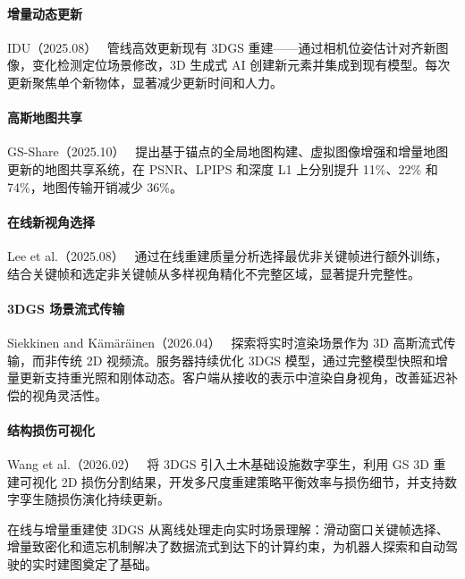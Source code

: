 \paragraph{增量动态更新}

IDU（2025.08）~\cite{2508_17579} 管线高效更新现有 3DGS 重建——通过相机位姿估计对齐新图像，变化检测定位场景修改，3D 生成式 AI 创建新元素并集成到现有模型。每次更新聚焦单个新物体，显著减少更新时间和人力。

\paragraph{高斯地图共享}

GS-Share（2025.10）~\cite{2510_02884} 提出基于锚点的全局地图构建、虚拟图像增强和增量地图更新的地图共享系统，在 PSNR、LPIPS 和深度 L1 上分别提升 11\%、22\% 和 74\%，地图传输开销减少 36\%。

\paragraph{在线新视角选择}

Lee et al.（2025.08）~\cite{2508_14014} 通过在线重建质量分析选择最优非关键帧进行额外训练，结合关键帧和选定非关键帧从多样视角精化不完整区域，显著提升完整性。

\paragraph{3DGS 场景流式传输}

Siekkinen and K\"{a}m\"{a}r\"{a}inen（2026.04）~\cite{2604_02851} 探索将实时渲染场景作为 3D 高斯流式传输，而非传统 2D 视频流。服务器持续优化 3DGS 模型，通过完整模型快照和增量更新支持重光照和刚体动态。客户端从接收的表示中渲染自身视角，改善延迟补偿的视角灵活性。

\paragraph{结构损伤可视化}

Wang et al.（2026.02）~\cite{2602_16713} 将 3DGS 引入土木基础设施数字孪生，利用 GS 3D 重建可视化 2D 损伤分割结果，开发多尺度重建策略平衡效率与损伤细节，并支持数字孪生随损伤演化持续更新。

\begin{takeaway}
在线与增量重建使 3DGS 从离线处理走向实时场景理解：滑动窗口关键帧选择、增量致密化和遗忘机制解决了数据流式到达下的计算约束，为机器人探索和自动驾驶的实时建图奠定了基础。
\end{takeaway}

